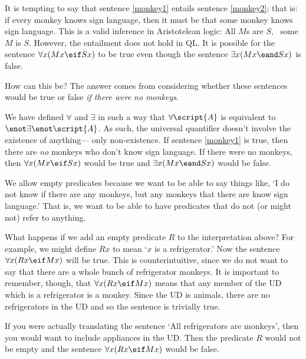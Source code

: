 It is tempting to say that sentence \ref{monkey1} entails sentence \ref{monkey2}; that is: if every monkey knows sign language, then it must be that some monkey knows sign language. This is a valid inference in Aristotelean logic: All $M$s are $S$, \therefore\ some $M$ is $S$. However, the entailment does not hold in QL. It is possible for the sentence $\forall x(Mx \eif Sx)$ to be true even though the sentence $\exists x(Mx \eand Sx)$ is false.

How can this be? The answer comes from considering whether these sentences would be true or false \emph{if there were no monkeys}.


We have defined $\forall$ and $\exists$ in such a way that $\forall\script{A}$ is equivalent to $\enot \exists\enot \script{A}$. As such, the universal quantifier doesn't involve the existence of anything--- only non-existence. If sentence \ref{monkey1} is true, then there are \emph{no} monkeys who don't know sign language. If there were no monkeys, then $\forall x(Mx \eif Sx)$ would be true and $\exists x(Mx \eand Sx)$ would be false.

We allow empty predicates because we want to be able to say things like, `I do not know if there are any monkeys, but any monkeys that there are know sign language.' That is, we want to be able to have predicates that do not (or might not) refer to anything.


What happens if we add an empty predicate $R$ to the interpretation above? For example, we might define $Rx$ to mean `$x$ is a refrigerator.' Now the sentence $\forall x(Rx \eif Mx)$ will be true. This is counterintuitive, since we do not want to say that there are a whole bunch of refrigerator monkeys. It is important to remember, though, that $\forall x(Rx \eif Mx)$ means that any member of the UD which is a refrigerator is a monkey. Since the UD is animals, there are no refrigerators in the UD and so the sentence is trivially true.

If you were actually translating the sentence `All refrigerators are monkeys', then you would want to include appliances in the UD. Then the predicate $R$ would not be empty and the sentence $\forall x(Rx \eif Mx)$ would be false.

